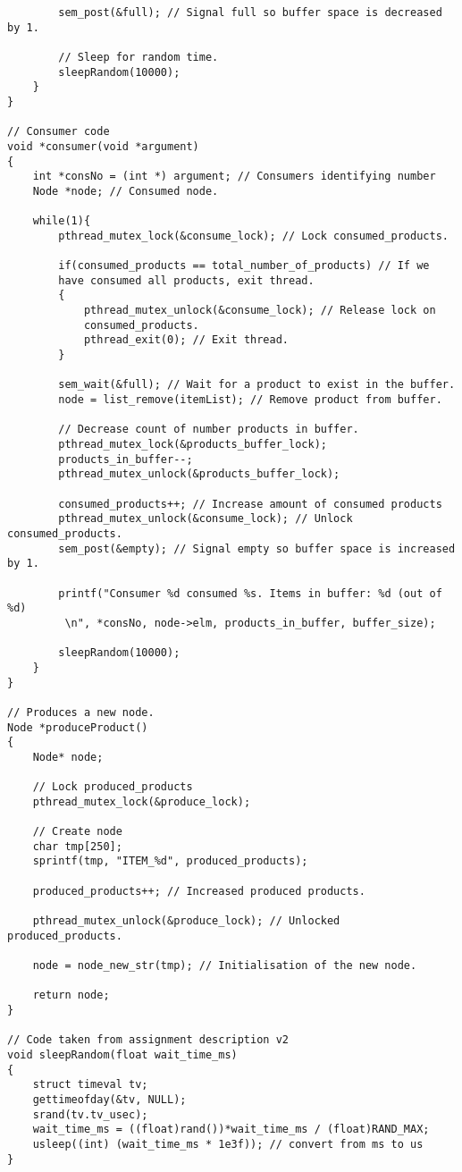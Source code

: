 \begin{lstlisting}
		sem_post(&full); // Signal full so buffer space is decreased by 1.
		
		// Sleep for random time.
		sleepRandom(10000);
	}
}

// Consumer code
void *consumer(void *argument)
{
	int *consNo = (int *) argument; // Consumers identifying number
	Node *node; // Consumed node.
	
	while(1){
		pthread_mutex_lock(&consume_lock); // Lock consumed_products.
		
		if(consumed_products == total_number_of_products) // If we 
		have consumed all products, exit thread.
		{
			pthread_mutex_unlock(&consume_lock); // Release lock on 
			consumed_products.
			pthread_exit(0); // Exit thread.
		}
		
		sem_wait(&full); // Wait for a product to exist in the buffer.
		node = list_remove(itemList); // Remove product from buffer.

		// Decrease count of number products in buffer.
		pthread_mutex_lock(&products_buffer_lock);
		products_in_buffer--;
		pthread_mutex_unlock(&products_buffer_lock);
		
		consumed_products++; // Increase amount of consumed products
		pthread_mutex_unlock(&consume_lock); // Unlock consumed_products.
		sem_post(&empty); // Signal empty so buffer space is increased by 1.

		printf("Consumer %d consumed %s. Items in buffer: %d (out of %d)
		 \n", *consNo, node->elm, products_in_buffer, buffer_size);
		
		sleepRandom(10000);
	}
}

// Produces a new node.
Node *produceProduct()
{
	Node* node;
	
	// Lock produced_products
	pthread_mutex_lock(&produce_lock);

	// Create node
	char tmp[250];
	sprintf(tmp, "ITEM_%d", produced_products);
	
	produced_products++; // Increased produced products.

	pthread_mutex_unlock(&produce_lock); // Unlocked produced_products.
	
	node = node_new_str(tmp); // Initialisation of the new node.
	
	return node;
}

// Code taken from assignment description v2
void sleepRandom(float wait_time_ms)
{
	struct timeval tv;
	gettimeofday(&tv, NULL);
	srand(tv.tv_usec);
	wait_time_ms = ((float)rand())*wait_time_ms / (float)RAND_MAX;
	usleep((int) (wait_time_ms * 1e3f)); // convert from ms to us
}
\end{lstlisting}